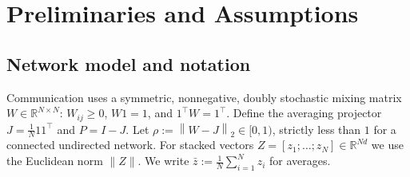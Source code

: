 \documentclass[11pt,a4paper]{article}
\def\one{1}%
\def\J{J}%
\def\Pmat{P}%
\newcommand{\R}{\mathbb{R}}
\newcommand{\one}{\mathbf{1}}
\newcommand{\normtwo}[1]{\left\|#1\right\|_2}
\newcommand{\J}{\left(\frac{1}{N}\one\one^\top\right)}
\newcommand{\Pmat}{I-\J}
\begin{document}
	\section{Preliminaries and Assumptions}\label{sec:prelim}
	\subsection{Network model and notation}
	Communication uses a symmetric, nonnegative, doubly stochastic mixing matrix $W\in\R^{N\times N}$:
	$W_{ij}\ge0$, $W\one=\one$, and $\one^\top W=\one^\top$.
	Define the averaging projector $\J=\frac{1}{N}\one\one^\top$ and $\Pmat=I-\J$.
	Let $\rho := \normtwo{W-\J}\in[0,1)$, strictly less than $1$ for a connected undirected network.
	For stacked vectors $Z=[z_1;\dots;z_N]\in\R^{Nd}$ we use the Euclidean norm $\|Z\|$.
	We write $\bar z:=\frac1N\sum_{i=1}^N z_i$ for averages.
	
\end{document}
